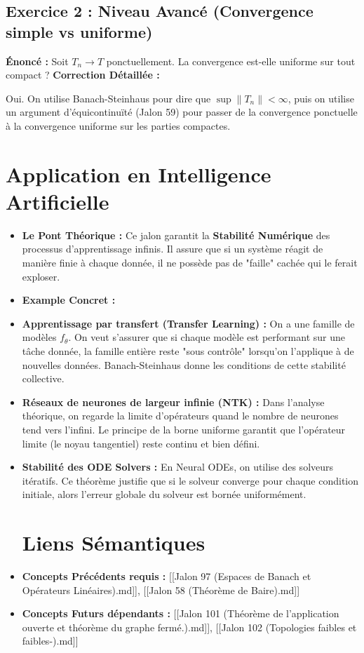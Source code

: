 \documentclass[11pt,a4paper]{article}
\begin{document}
\begin{enumerate}
\subsection{Exercice 2 : Niveau Avancé (Convergence simple vs uniforme)}
\textbf{Énoncé :} Soit $T_n \to T$ ponctuellement. La convergence est-elle uniforme sur tout compact ?
\textbf{Correction Détaillée :}
\end{enumerate}
Oui. On utilise Banach-Steinhaus pour dire que $\sup \|T_n\| < \infty$, puis on utilise un argument d'équicontinuïté (Jalon 59) pour passer de la convergence ponctuelle à la convergence uniforme sur les parties compactes.

\section{Application en Intelligence Artificielle}

\begin{itemize}
\item \textbf{Le Pont Théorique :} Ce jalon garantit la \textbf{Stabilité Numérique} des processus d'apprentissage infinis. Il assure que si un système réagit de manière finie à chaque donnée, il ne possède pas de "faille" cachée qui le ferait exploser.
\item \textbf{Example Concret :}
\item \textbf{Apprentissage par transfert (Transfer Learning) :} On a une famille de modèles $f_\theta$. On veut s'assurer que si chaque modèle est performant sur une tâche donnée, la famille entière reste "sous contrôle" lorsqu'on l'applique à de nouvelles données. Banach-Steinhaus donne les conditions de cette stabilité collective.
\item \textbf{Réseaux de neurones de largeur infinie (NTK) :} Dans l'analyse théorique, on regarde la limite d'opérateurs quand le nombre de neurones tend vers l'infini. Le principe de la borne uniforme garantit que l'opérateur limite (le noyau tangentiel) reste continu et bien défini.
\item \textbf{Stabilité des ODE Solvers :} En Neural ODEs, on utilise des solveurs itératifs. Ce théorème justifie que si le solveur converge pour chaque condition initiale, alors l'erreur globale du solveur est bornée uniformément.

\section{Liens Sémantiques}

\item \textbf{Concepts Précédents requis :} [[Jalon 97 (Espaces de Banach et Opérateurs Linéaires).md]], [[Jalon 58 (Théorème de Baire).md]]
\item \textbf{Concepts Futurs dépendants :} [[Jalon 101 (Théorème de l'application ouverte et théorème du graphe fermé.).md]], [[Jalon 102 (Topologies faibles et faibles-).md]]

\end{itemize}
\end{document}
